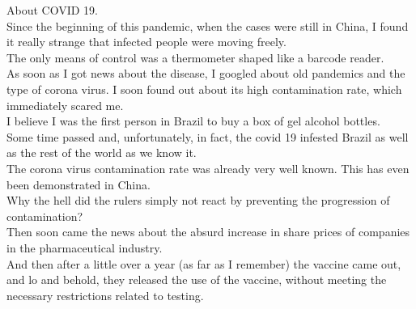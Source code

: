 \documentclass{book}
\begin{document}
About COVID 19. \\

Since the beginning of this pandemic, when the cases were still in China, I found it really strange that infected people were moving freely. \\

The only means of control was a thermometer shaped like a barcode reader. \\

As soon as I got news about the disease, I googled about old pandemics and the type of corona virus. I soon found out about its high contamination rate, which immediately scared me. \\

I believe I was the first person in Brazil to buy a box of gel alcohol bottles. \\

Some time passed and, unfortunately, in fact, the covid 19 infested Brazil as well as the rest of the world as we know it. \\

The corona virus contamination rate was already very well known. This has even been demonstrated in China. \\

Why the hell did the rulers simply not react by preventing the progression of contamination? \\

Then soon came the news about the absurd increase in share prices of companies in the pharmaceutical industry. \\

And then after a little over a year (as far as I remember) the vaccine came out, and lo and behold, they released the use of the vaccine, without meeting the necessary restrictions related to testing. \\
\end{document}
